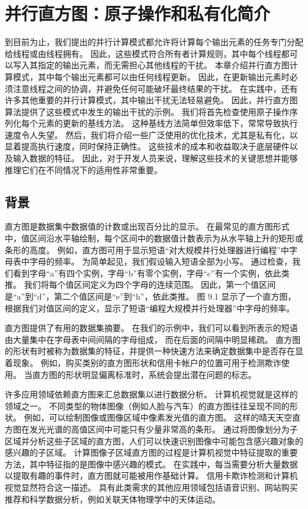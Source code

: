 \section{并行直方图：原子操作和私有化简介}
到目前为止，我们提出的并行计算模式都允许将计算每个输出元素的任务专门分配给线程或由线程拥有。 
因此，这些模式符合所有者计算规则，其中每个线程都可以写入其指定的输出元素，而无需担心其他线程的干扰。 
本章介绍并行直方图计算模式，其中每个输出元素都可以由任何线程更新。 
因此，在更新输出元素时必须注意线程之间的协调，并避免任何可能破坏最终结果的干扰。 
在实践中，还有许多其他重要的并行计算模式，其中输出干扰无法轻易避免。 
因此，并行直方图算法提供了这些模式中发生的输出干扰的示例。 我们将首先检查使用原子操作序列化每个元素的更新的基线方法。 
这种基线方法简单但效率低下，常常导致执行速度令人失望。 
然后，我们将介绍一些广泛使用的优化技术，尤其是私有化，以显着提高执行速度，同时保持正确性。 
这些技术的成本和收益取决于底层硬件以及输入数据的特征。 
因此，对于开发人员来说，理解这些技术的关键思想并能够推理它们在不同情况下的适用性非常重要。

\subsection{背景}
直方图是数据集中数据值的计数或出现百分比的显示。 
在最常见的直方图形式中，值区间沿水平轴绘制，每个区间中的数据值计数表示为从水平轴上升的矩形或条形的高度。 
例如，直方图可用于显示短语“对大规模并行处理器进行编程”中字母表中字母的频率。 为简单起见，我们假设输入短语全部为小写。 
通过检查，我们看到字母“a”有四个实例，字母“b”有零个实例，字母“c”有一个实例，依此类推。 
我们将每个值区间定义为四个字母的连续范围。 因此，第一个值区间是“a”到“d”，第二个值区间是“e”到“h”，依此类推。 
图 9.1 显示了一个直方图，根据我们对值区间的定义，显示了短语“编程大规模并行处理器”中字母的频率。

直方图提供了有用的数据集摘要。 在我们的示例中，我们可以看到所表示的短语由大量集中在字母表中间间隔的字母组成，
而在后面的间隔中明显稀疏。 直方图的形状有时被称为数据集的特征，并提供一种快速方法来确定数据集中是否存在显着现象。 
例如，购买类别的直方图形状和信用卡帐户的位置可用于检测欺诈使用。 当直方图的形状明显偏离标准时，系统会提出潜在问题的标志。

许多应用领域依赖直方图来汇总数据集以进行数据分析。 计算机视觉就是这样的领域之一。 
不同类型的物体图像（例如人脸与汽车）的直方图往往呈现不同的形状。 例如，可以绘制图像或图像区域中像素发光值的直方图。 
这样的晴天天空直方图在发光光谱的高值区间中可能只有少量非常高的条形。 
通过将图像划分为子区域并分析这些子区域的直方图，人们可以快速识别图像中可能包含感兴趣对象的感兴趣的子区域。 
计算图像子区域直方图的过程是计算机视觉中特征提取的重要方法，其中特征指的是图像中感兴趣的模式。 
在实践中，每当需要分析大量数据以提取有趣的事件时，直方图就可能被用作基础计算。 信用卡欺诈检测和计算机视觉显然符合这一描述。 
具有此类需求的其他应用领域包括语音识别、网站购买推荐和科学数据分析，例如关联天体物理学中的天体运动。


